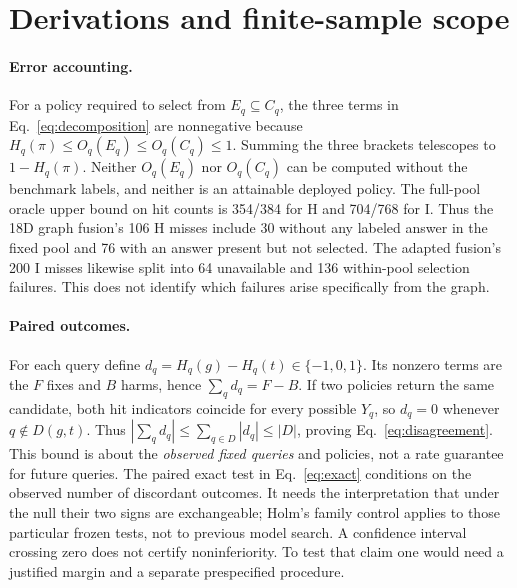 \section{Derivations and finite-sample scope}\label{app:derivations}
\paragraph{Error accounting.}
For a policy required to select from $E_q\subseteq C_q$, the three terms in
Eq.~\eqref{eq:decomposition} are nonnegative because
$H_q(\pi)\le O_q(E_q)\le O_q(C_q)\le1$. Summing the three brackets
telescopes to $1-H_q(\pi)$. Neither $O_q(E_q)$ nor $O_q(C_q)$ can be
computed without the benchmark labels, and neither is an attainable
deployed policy. The full-pool oracle upper bound on hit counts is 354/384
for H and 704/768 for I. Thus the 18D graph fusion's 106 H misses include
30 without any labeled answer in the fixed pool and 76 with an answer
present but not selected. The adapted fusion's 200 I misses likewise
split into 64 unavailable and 136 within-pool selection failures. This
does not identify which failures arise specifically from the graph.

\paragraph{Paired outcomes.}
For each query define $d_q=H_q(g)-H_q(t)\in\{-1,0,1\}$. Its nonzero terms
are the $F$ fixes and $B$ harms, hence
$\sum_qd_q=F-B$. If two policies return the same candidate, both hit
indicators coincide for every possible $Y_q$, so $d_q=0$ whenever
$q\notin D(g,t)$. Thus
$|\sum_qd_q|\le\sum_{q\in D}|d_q|\le |D|$, proving
Eq.~\eqref{eq:disagreement}. This bound is about the \emph{observed
fixed queries} and policies, not a rate guarantee for future queries.
The paired exact test in Eq.~\eqref{eq:exact} conditions on the observed
number of discordant outcomes. It needs the interpretation that under the
null their two signs are exchangeable; Holm's family control applies to
those particular frozen tests, not to previous model search. A confidence
interval crossing zero does not certify noninferiority. To test that claim
one would need a justified margin and a separate prespecified procedure.

